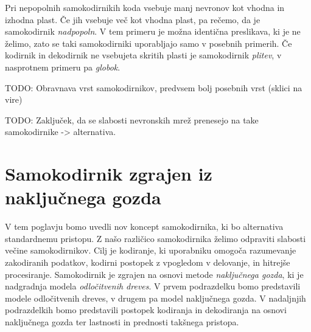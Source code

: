 \documentclass[12pt,a4paper,twoside]{article}
\theoremstyle{definition} %
\theoremstyle{plain} %
\numberwithin{equation}{section}  %
\begin{document}
Pri nepopolnih samokodirnikih koda vsebuje manj nevronov kot vhodna in izhodna plast. 
Če jih vsebuje več kot vhodna plast, pa rečemo, da je samokodirnik \emph{nadpopoln}. 
V tem primeru je možna identična preslikava, ki je ne želimo, zato se taki samokodirniki uporabljajo samo v posebnih primerih. 
Če kodirnik in dekodirnik ne vsebujeta skritih plasti je samokodirnik \emph{plitev}, v nasprotnem primeru pa \emph{globok}.


TODO: Obravnava vrst samokodirnikov, predvsem bolj posebnih vrst (sklici na vire)

TODO: Zaključek, da se slabosti nevronskih mrež prenesejo na take samokodirnike -> alternativa.




\section{Samokodirnik zgrajen iz naključnega gozda}
\label{pogl:rf_samokodirnik}

V tem poglavju bomo uvedli nov koncept samokodirnika, ki bo alternativa standardnemu pristopu. 
Z našo različico samokodirnika želimo odpraviti slabosti večine samokodirnikov. 
Cilj je kodiranje, ki uporabniku omogoča razumevanje zakodiranih podatkov, kodirni postopek z vpogledom v delovanje, in hitrejše procesiranje. 
Samokodirnik je zgrajen na osnovi metode \emph{naključnega gozda}, ki je nadgradnja modela \emph{odločitvenih dreves}.
V prvem podrazdelku bomo predstavili modele odločitvenih dreves, v drugem pa model naključnega gozda. 
V nadaljnjih podrazdelkih bomo predstavili postopek kodiranja in dekodiranja na osnovi naključnega gozda ter lastnosti in prednosti takšnega pristopa.

\end{document}
